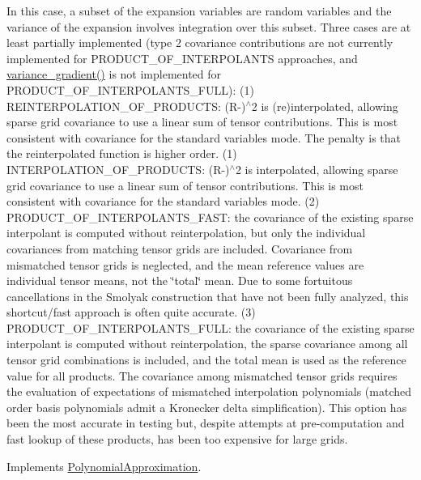 In this case, a subset of the expansion variables are random variables and the variance of the expansion involves integration over this subset. Three cases are at least partially implemented (type 2 covariance contributions are not currently implemented for P\+R\+O\+D\+U\+C\+T\+\_\+\+O\+F\+\_\+\+I\+N\+T\+E\+R\+P\+O\+L\+A\+N\+TS approaches, and \hyperlink{classPecos_1_1NodalInterpPolyApproximation_ae898fc2f42f1077268f89fc2e9f2c71c}{variance\+\_\+gradient()} is not implemented for P\+R\+O\+D\+U\+C\+T\+\_\+\+O\+F\+\_\+\+I\+N\+T\+E\+R\+P\+O\+L\+A\+N\+T\+S\+\_\+\+F\+U\+LL)\+: (1) R\+E\+I\+N\+T\+E\+R\+P\+O\+L\+A\+T\+I\+O\+N\+\_\+\+O\+F\+\_\+\+P\+R\+O\+D\+U\+C\+TS\+: (R-\/)$^\wedge$2 is (re)interpolated, allowing sparse grid covariance to use a linear sum of tensor contributions. This is most consistent with covariance for the standard variables mode. The penalty is that the reinterpolated function is higher order. (1) I\+N\+T\+E\+R\+P\+O\+L\+A\+T\+I\+O\+N\+\_\+\+O\+F\+\_\+\+P\+R\+O\+D\+U\+C\+TS\+: (R-\/)$^\wedge$2 is interpolated, allowing sparse grid covariance to use a linear sum of tensor contributions. This is most consistent with covariance for the standard variables mode. (2) P\+R\+O\+D\+U\+C\+T\+\_\+\+O\+F\+\_\+\+I\+N\+T\+E\+R\+P\+O\+L\+A\+N\+T\+S\+\_\+\+F\+A\+ST\+: the covariance of the existing sparse interpolant is computed without reinterpolation, but only the individual covariances from matching tensor grids are included. Covariance from mismatched tensor grids is neglected, and the mean reference values are individual tensor means, not the \char`\"{}total\char`\"{} mean. Due to some fortuitous cancellations in the Smolyak construction that have not been fully analyzed, this shortcut/fast approach is often quite accurate. (3) P\+R\+O\+D\+U\+C\+T\+\_\+\+O\+F\+\_\+\+I\+N\+T\+E\+R\+P\+O\+L\+A\+N\+T\+S\+\_\+\+F\+U\+LL\+: the covariance of the existing sparse interpolant is computed without reinterpolation, the sparse covariance among all tensor grid combinations is included, and the total mean is used as the reference value for all products. The covariance among mismatched tensor grids requires the evaluation of expectations of mismatched interpolation polynomials (matched order basis polynomials admit a Kronecker delta simplification). This option has been the most accurate in testing but, despite attempts at pre-\/computation and fast lookup of these products, has been too expensive for large grids. 

Implements \hyperlink{classPecos_1_1PolynomialApproximation_ac510eafe010d3ae6b6d4d4c296ae3f8b}{Polynomial\+Approximation}.




